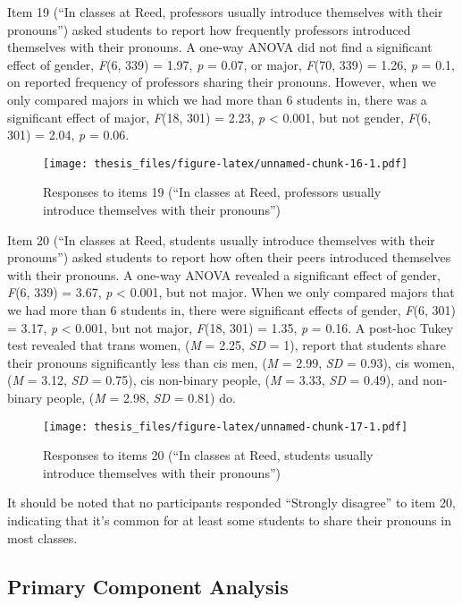 \documentclass[12pt,twoside]{reedthesis}
\begin{document}
Item 19 (``In classes at Reed, professors usually introduce themselves with their pronouns'') asked students to report how frequently professors introduced themselves with their pronouns. A one-way ANOVA did not find a significant effect of gender, \emph{F}(6, 339) = 1.97, \emph{p} = 0.07, or major, \emph{F}(70, 339) = 1.26, \emph{p} = 0.1, on reported frequency of professors sharing their pronouns. However, when we only compared majors in which we had more than 6 students in, there was a significant effect of major, \emph{F}(18, 301) = 2.23, \emph{p} \textless{} 0.001, but not gender, \emph{F}(6, 301) = 2.04, \emph{p} = 0.06.
\begin{figure}
\centering
\texttt{[image: thesis\_files/figure-latex/unnamed-chunk-16-1.pdf]}
\caption{\label{fig:unnamed-chunk-16}Responses to items 19 (``In classes at Reed, professors usually introduce themselves with their pronouns'')}
\end{figure}
Item 20 (``In classes at Reed, students usually introduce themselves with their pronouns'') asked students to report how often their peers introduced themselves with their pronouns. A one-way ANOVA revealed a significant effect of gender, \emph{F}(6, 339) = 3.67, \emph{p} \textless{} 0.001, but not major. When we only compared majors that we had more than 6 students in, there were significant effects of gender, \emph{F}(6, 301) = 3.17, \emph{p} \textless{} 0.001, but not major, \emph{F}(18, 301) = 1.35, \emph{p} = 0.16. A post-hoc Tukey test revealed that trans women, (\emph{M} = 2.25, \emph{SD} = 1), report that students share their pronouns significantly less than cis men, (\emph{M} = 2.99, \emph{SD} = 0.93), cis women, (\emph{M} = 3.12, \emph{SD} = 0.75), cis non-binary people, (\emph{M} = 3.33, \emph{SD} = 0.49), and non-binary people, (\emph{M} = 2.98, \emph{SD} = 0.81) do.
\begin{figure}
\centering
\texttt{[image: thesis\_files/figure-latex/unnamed-chunk-17-1.pdf]}
\caption{\label{fig:unnamed-chunk-17}Responses to items 20 (``In classes at Reed, students usually introduce themselves with their pronouns'')}
\end{figure}
It should be noted that no participants responded ``Strongly disagree'' to item 20, indicating that it's common for at least some students to share their pronouns in most classes.

\hypertarget{primary-component-analysis}{%
\subsection{Primary Component Analysis}\label{primary-component-analysis}}
\end{document}
